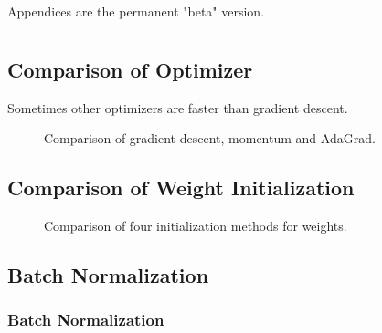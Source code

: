 \documentclass{article}
\theoremstyle{definition}
\renewcommand{\theequation}{\arabic{section}.\arabic{equation}}
\renewcommand{\thefigure}{\arabic{section}.\arabic{figure}}
\begin{document}

\newpage


\renewcommand\thefigure{\thesection.\arabic{figure}}
\renewcommand\theequation{\thesection.\arabic{equation}}

\begin{appendices}

Appendices are the permanent "beta" version.




\section{}

\subsection{Comparison of Optimizer}

Sometimes other optimizers are faster than gradient descent.

\begin{figure}[H]
    \centering
    \begin{subfigure}[H]{1.0\textwidth}
	\end{subfigure}
    \caption{Comparison of gradient descent, momentum and AdaGrad.}
    \label{fig:A.1}
\end{figure}

\subsection{Comparison of Weight Initialization}

\begin{figure}[H]
    \centering
    \begin{subfigure}[H]{1.0\textwidth}
	\end{subfigure}
    \caption{Comparison of four initialization methods for weights.}
    \label{fig:A.2}
\end{figure}

\subsection{Batch Normalization}

\subsubsection{Batch Normalization}


\end{appendices}
\end{document}
